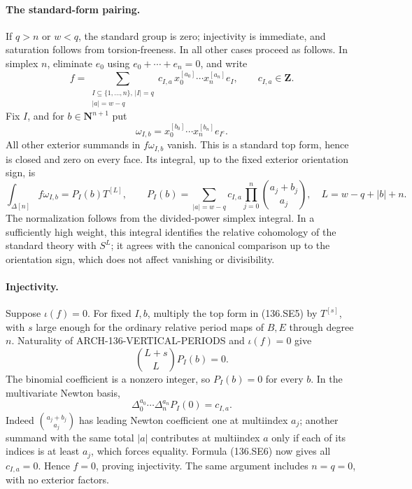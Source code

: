 \paragraph{The standard-form pairing.}
If \(q>n\) or \(w<q\), the standard group is zero;
injectivity is immediate, and saturation follows from
torsion-freeness. In all other cases proceed as follows.
In simplex \(n\), eliminate \(e_0\) using
\(e_0+\cdots+e_n=0\), and write
\[
 f=\sum_{\substack{I\subseteq\{1,\ldots,n\},\,|I|=q\\
                         |a|=w-q}}
     c_{I,a}\,
       x_0^{[a_0]}\cdots x_n^{[a_n]}e_I,\qquad
                         c_{I,a}\in\mathbf Z.
 \tag{136.SE4}
\]
Fix \(I\), and for \(b\in\mathbf N^{n+1}\) put
\[
                 \omega_{I,b}
                   =x_0^{[b_0]}\cdots x_n^{[b_n]}e_{I^c}.
 \]
All other exterior summands in \(f\omega_{I,b}\) vanish.
This is a standard top form, hence is closed and zero
on every face. Its integral, up to the fixed exterior
orientation sign, is
\[
 \int_{\Delta[n]}f\omega_{I,b}
       =P_I(b)T^{[L]},\qquad
 P_I(b)=\sum_{|a|=w-q}c_{I,a}
                      \prod_{j=0}^n\binom{a_j+b_j}{a_j},
 \quad L=w-q+|b|+n.
 \tag{136.SE5}
\]
The normalization follows from the divided-power simplex
integral. In a sufficiently high weight, this integral
identifies the relative cohomology of the standard theory
with \(S^L\); it agrees with the canonical comparison up
to the orientation sign, which does not affect vanishing
or divisibility.

\paragraph{Injectivity.}
Suppose \(\iota(f)=0\). For fixed \(I,b\), multiply the
top form in (136.SE5) by \(T^{[s]}\), with \(s\) large
enough for the ordinary relative period maps of \(B,E\)
through degree \(n\). Naturality of
ARCH-136-VERTICAL-PERIODS and \(\iota(f)=0\) give
\[
                          \binom{L+s}{L}P_I(b)=0.
 \]
The binomial coefficient is a nonzero integer, so
\(P_I(b)=0\) for every \(b\).
In the multivariate Newton basis,
\[
              \Delta_0^{a_0}\cdots\Delta_n^{a_n}P_I(0)
                              =c_{I,a}.
 \tag{136.SE6}
\]
Indeed \(\binom{a_j+b_j}{a_j}\) has leading Newton
coefficient one at multiindex \(a_j\); another summand
with the same total \(|a|\) contributes at multiindex
\(a\) only if each of its indices is at least \(a_j\),
which forces equality. Formula (136.SE6) now gives all
\(c_{I,a}=0\). Hence \(f=0\), proving injectivity.
The same argument includes \(n=q=0\), with no exterior
factors.

